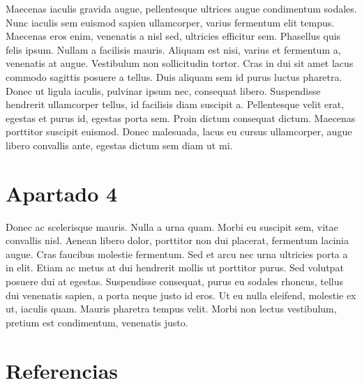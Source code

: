 \documentclass[
  13pt,
]{interact}
\begin{document}
Maecenas iaculis gravida augue, pellentesque ultrices augue condimentum
sodales. Nunc iaculis sem euismod sapien ullamcorper, varius fermentum
elit tempus. Maecenas eros enim, venenatis a nisl sed, ultricies
efficitur sem. Phasellus quis felis ipsum. Nullam a facilisis mauris.
Aliquam est nisi, varius et fermentum a, venenatis at augue. Vestibulum
non sollicitudin tortor. Cras in dui sit amet lacus commodo sagittis
posuere a tellus. Duis aliquam sem id purus luctus pharetra. Donec ut
ligula iaculis, pulvinar ipsum nec, consequat libero. Suspendisse
hendrerit ullamcorper tellus, id facilisis diam suscipit a. Pellentesque
velit erat, egestas et purus id, egestas porta sem. Proin dictum
consequat dictum. Maecenas porttitor suscipit euismod. Donec malesuada,
lacus eu cursus ullamcorper, augue libero convallis ante, egestas dictum
sem diam ut mi.

\section{Apartado 4}\label{apartado-4}

Donec ac scelerisque mauris. Nulla a urna quam. Morbi eu suscipit sem,
vitae convallis nisl. Aenean libero dolor, porttitor non dui placerat,
fermentum lacinia augue. Cras faucibus molestie fermentum. Sed et arcu
nec urna ultricies porta a in elit. Etiam ac metus at dui hendrerit
mollis ut porttitor purus. Sed volutpat posuere dui at egestas.
Suspendisse consequat, purus eu sodales rhoncus, tellus dui venenatis
sapien, a porta neque justo id eros. Ut eu nulla eleifend, molestie ex
ut, iaculis quam. Mauris pharetra tempus velit. Morbi non lectus
vestibulum, pretium est condimentum, venenatis justo.

\section{Referencias}\label{referencias}
\end{document}
